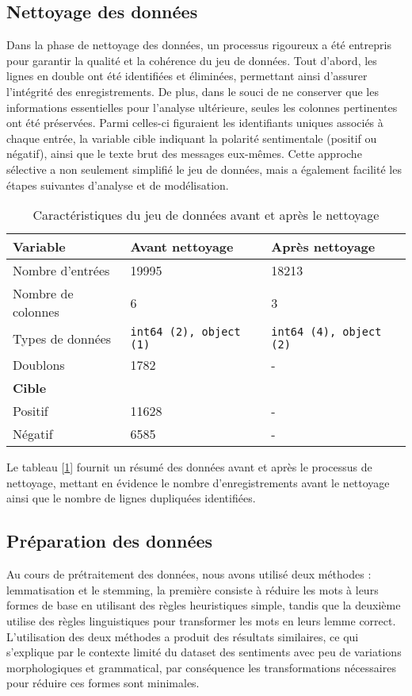 \subsection{Nettoyage des données} 
Dans la phase de nettoyage des données, un processus rigoureux a été entrepris pour garantir la qualité et la cohérence du jeu de données. Tout d'abord, les lignes en double ont été identifiées et éliminées, permettant ainsi d'assurer l'intégrité des enregistrements. De plus, dans le souci de ne conserver que les informations essentielles pour l'analyse ultérieure, seules les colonnes pertinentes ont été préservées. Parmi celles-ci figuraient les identifiants uniques associés à chaque entrée, la variable cible indiquant la polarité sentimentale (positif ou négatif), ainsi que le texte brut des messages eux-mêmes. Cette approche sélective a non seulement simplifié le jeu de données, mais a également facilité les étapes suivantes d'analyse et de modélisation.
\begin{table}[h!]
    \centering
    \begin{tabular}{lll}
        \toprule
        \textbf{Variable} & \textbf{Avant nettoyage} & \textbf{Après nettoyage} \\
        \midrule
        Nombre d'entrées & 19995 & 18213 \\
        Nombre de colonnes & 6 & 3 \\
        Types de données & \texttt{int64 (2), object (1)} & \texttt{int64 (4), object (2)} \\
        Doublons & 1782 & - \\
        \midrule
        \textbf{Cible} & & \\
        Positif & 11628 & - \\
        Négatif & 6585 & - \\
        \bottomrule
    \end{tabular}
    \caption{Caractéristiques du jeu de données avant et après le nettoyage}
    \label{tab:data_summary}
\end{table}
Le tableau [\ref{tab:data_summary}] fournit un résumé des données avant et après le processus de nettoyage, mettant en évidence le nombre d'enregistrements avant le nettoyage ainsi que le nombre de lignes dupliquées identifiées.


\newpage

\subsection{Préparation des données}
Au cours de prétraitement des données, nous avons utilisé deux méthodes : lemmatisation et le stemming, la première consiste à réduire les mots à leurs formes de base en utilisant des règles heuristiques simple, tandis que la deuxième utilise des règles linguistiques pour transformer les mots en leurs lemme correct.
L’utilisation des deux méthodes a produit des résultats similaires, ce qui s’explique par le contexte limité du dataset des sentiments avec peu de variations morphologiques et grammatical, par conséquence les transformations nécessaires pour réduire ces formes sont minimales.


